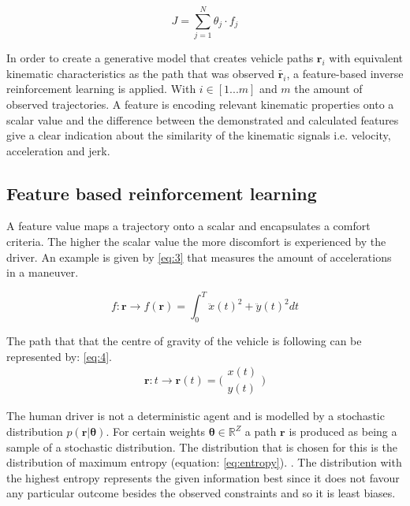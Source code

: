\begin{equation}\label{eq:1}
	J = \sum_{j=1}^{N}\theta_j\cdot f_j	
\end{equation}


In order to create a generative model that creates vehicle paths $\bm{r}_i$ with equivalent kinematic characteristics as the path that was observed $\tilde{\bm{r}_i}$, a feature-based inverse reinforcement learning is applied. \cite{Kuderer2015a,Abbeel2004} With $i \in [1 ... m]$ and $m$ the amount of observed trajectories. A feature is encoding relevant kinematic properties onto a scalar value and the difference between the demonstrated and calculated features give a clear indication about the similarity of the kinematic signals i.e. velocity, acceleration and jerk. \\

\subsection{Feature based reinforcement learning}
A feature value maps a trajectory onto a scalar and encapsulates a comfort criteria. The higher the scalar value the more discomfort is experienced by the driver. An example is given by \ref{eq:3} that measures the amount of accelerations in a maneuver.

\begin{equation}\label{eq:3}
f:\bm{r}\xrightarrow{}f(\bm{r})=\int_{0}^{T}\ddot{x}(t)^{2}+\ddot{y}(t)^{2} dt
\end{equation}

The path that that the centre of gravity of the vehicle is following can be represented by: \ref{eq:4}.
\begin{equation}\label{eq:4}
\bm{r}:t \xrightarrow{}\bm{r}(t) =  \bigl( \begin{smallmatrix} x(t)\\ y(t) \end{smallmatrix}\bigr)
\end{equation}

The human driver is not a deterministic agent and is modelled by a stochastic distribution $p(\bm{r}|\bm{\theta})$. For certain weights $\bm{\theta} \in \mathbb{R}^Z$ a path $\bm{r}$ is produced as being a sample of a stochastic distribution. The distribution that is chosen for this is the distribution of maximum entropy (equation: \ref{eq:entropy}). \cite{Ziebart2008, Kretzschmar2014}. 
The distribution with the highest entropy represents the given information best since it does not favour any particular outcome besides the observed constraints and so it is least biases. \cite{Abbeel2004,Kuderer2015a}
	
